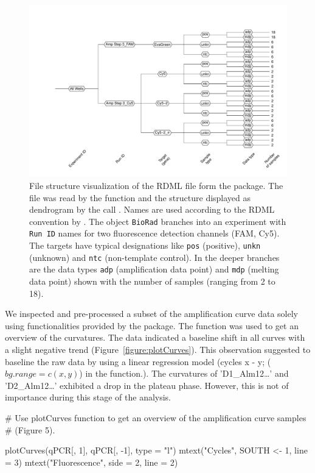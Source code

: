 \begin{figure}[htbp]
  \centering
  \includegraphics[clip=true,trim=4cm 1cm 0.9cm 2.75cm, width=12cm]{figures/RDML_dendrogram.pdf}
  \caption{File structure visualization of the RDML file 
 form the  package. The file was read 
by the  function and the structure displayed as dendrogram by the 
call . Names are used according to the RDML 
convention by \citet{lefever_2009}. The object \texttt{BioRad} branches into an 
experiment with \texttt{Run ID} names for two fluorescence detection channels 
(FAM, Cy5). The targets have typical designations like \texttt{pos} (positive), 
\texttt{unkn} (unknown) and \texttt{ntc} (non-template control). In the deeper 
branches are the data types \texttt{adp} (amplification data point) and 
\texttt{mdp} (melting data point) shown with the number of samples (ranging from 
2 to 18).
} 
\label{figure:RDML_dendrogram}
\end{figure}

We inspected and pre-processed a subset of the amplification curve data solely 
using functionalities provided by the  package. The 
 function was used to get an overview of the curvatures. The 
data indicated a baseline shift in all curves with a slight negative trend 
(Figure~\ref{figure:plotCurves}). This observation suggested to baseline the raw 
data by using a linear regression model (cycles x - y; ($bg.range = c(x, y)$) in 
the  function.). The curvatures of 'D1\_Alm12\ldots' and 
'D2\_Alm12\ldots' exhibited a drop in the plateau phase. However, this is not 
of importance during this stage of the analysis.

\begin{example}
# Use plotCurves function to get an overview of the amplification curve samples
# (Figure 5).

plotCurves(qPCR[, 1], qPCR[, -1], type = "l")
mtext("Cycles", SOUTH <- 1, line = 3)
mtext("Fluorescence", side = 2, line = 2)
\end{example}

